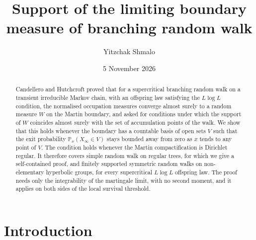 \documentclass[11pt]{amsart}
\title{Support of the limiting boundary measure of branching random walk}
\author{Yitzchak Shmalo}
\date{5 November 2026}
\theoremstyle{definition}
\theoremstyle{remark}
\numberwithin{equation}{section}
\newcommand{\Pp}{\mathbb P}
\newcommand{\1}{\mathbf 1}
\begin{document}
\begin{abstract}
Candellero and Hutchcroft proved that for a supercritical branching random walk on a transient irreducible Markov chain, with an offspring law satisfying the $L\log L$ condition, the normalised occupation measures converge almost surely to a random measure $W$ on the Martin boundary, and asked for conditions under which the support of $W$ coincides almost surely with the set of accumulation points of the walk. We show that this holds whenever the boundary has a countable basis of open sets $V$ such that the exit probability $\Pp_x(X_\infty\in V)$ stays bounded away from zero as $x$ tends to any point of $V$. The condition holds whenever the Martin compactification is Dirichlet regular. It therefore covers simple random walk on regular trees, for which we give a self-contained proof, and finitely supported symmetric random walks on non-elementary hyperbolic groups, for every supercritical $L\log L$ offspring law. The proof needs only the integrability of the martingale limit, with no second moment, and it applies on both sides of the local survival threshold.
\end{abstract}
\maketitle

\section{Introduction}
\end{document}
